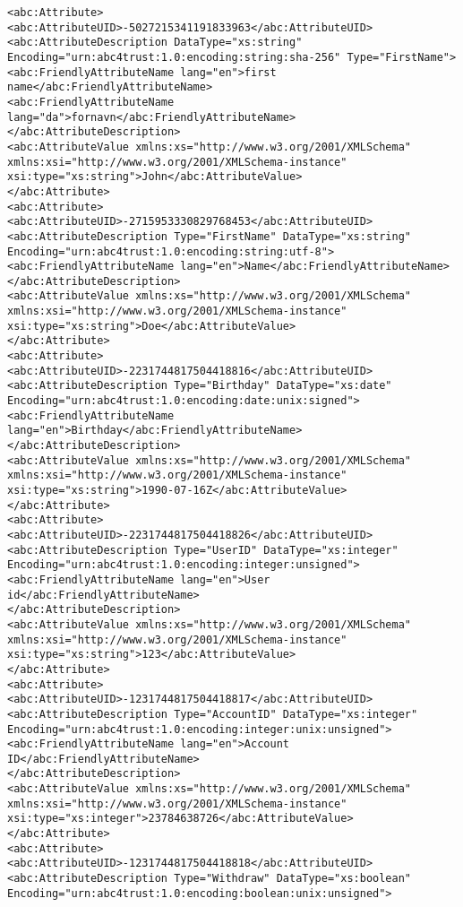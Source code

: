 \begin{lstlisting}[caption=Issuance Policy and Attributes]
<abc:Attribute>
<abc:AttributeUID>-5027215341191833963</abc:AttributeUID>
<abc:AttributeDescription DataType="xs:string" Encoding="urn:abc4trust:1.0:encoding:string:sha-256" Type="FirstName">
<abc:FriendlyAttributeName lang="en">first name</abc:FriendlyAttributeName>
<abc:FriendlyAttributeName lang="da">fornavn</abc:FriendlyAttributeName>
</abc:AttributeDescription>
<abc:AttributeValue xmlns:xs="http://www.w3.org/2001/XMLSchema" xmlns:xsi="http://www.w3.org/2001/XMLSchema-instance" xsi:type="xs:string">John</abc:AttributeValue>
</abc:Attribute>
<abc:Attribute>
<abc:AttributeUID>-2715953330829768453</abc:AttributeUID>
<abc:AttributeDescription Type="FirstName" DataType="xs:string" Encoding="urn:abc4trust:1.0:encoding:string:utf-8">
<abc:FriendlyAttributeName lang="en">Name</abc:FriendlyAttributeName>
</abc:AttributeDescription>
<abc:AttributeValue xmlns:xs="http://www.w3.org/2001/XMLSchema" xmlns:xsi="http://www.w3.org/2001/XMLSchema-instance" xsi:type="xs:string">Doe</abc:AttributeValue>
</abc:Attribute>
<abc:Attribute>
<abc:AttributeUID>-2231744817504418816</abc:AttributeUID>
<abc:AttributeDescription Type="Birthday" DataType="xs:date" Encoding="urn:abc4trust:1.0:encoding:date:unix:signed">
<abc:FriendlyAttributeName lang="en">Birthday</abc:FriendlyAttributeName>
</abc:AttributeDescription>
<abc:AttributeValue xmlns:xs="http://www.w3.org/2001/XMLSchema" xmlns:xsi="http://www.w3.org/2001/XMLSchema-instance" xsi:type="xs:string">1990-07-16Z</abc:AttributeValue>
</abc:Attribute>
<abc:Attribute>
<abc:AttributeUID>-2231744817504418826</abc:AttributeUID>
<abc:AttributeDescription Type="UserID" DataType="xs:integer" Encoding="urn:abc4trust:1.0:encoding:integer:unsigned">
<abc:FriendlyAttributeName lang="en">User id</abc:FriendlyAttributeName>
</abc:AttributeDescription>
<abc:AttributeValue xmlns:xs="http://www.w3.org/2001/XMLSchema" xmlns:xsi="http://www.w3.org/2001/XMLSchema-instance" xsi:type="xs:string">123</abc:AttributeValue>
</abc:Attribute>
<abc:Attribute>
<abc:AttributeUID>-1231744817504418817</abc:AttributeUID>
<abc:AttributeDescription Type="AccountID" DataType="xs:integer" Encoding="urn:abc4trust:1.0:encoding:integer:unix:unsigned">
<abc:FriendlyAttributeName lang="en">Account ID</abc:FriendlyAttributeName>
</abc:AttributeDescription>
<abc:AttributeValue xmlns:xs="http://www.w3.org/2001/XMLSchema" xmlns:xsi="http://www.w3.org/2001/XMLSchema-instance" xsi:type="xs:integer">23784638726</abc:AttributeValue>
</abc:Attribute>
<abc:Attribute>
<abc:AttributeUID>-1231744817504418818</abc:AttributeUID>
<abc:AttributeDescription Type="Withdraw" DataType="xs:boolean" Encoding="urn:abc4trust:1.0:encoding:boolean:unix:unsigned">

\end{lstlisting}
